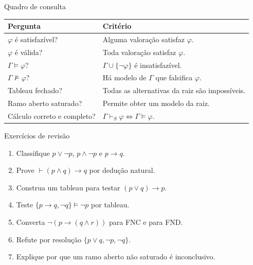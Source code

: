 \documentclass[10pt,aspectratio=169]{beamer}
\begin{document}
\begin{frame}{Quadro de consulta}

\small
\renewcommand{\arraystretch}{1.6}
\begin{tabular}{p{3.9cm}p{6.8cm}}
\toprule
Pergunta & Critério\\\midrule
$\varphi$ é satisfazível? & Alguma valoração satisfaz $\varphi$.\\
$\varphi$ é válida? & Toda valoração satisfaz $\varphi$.\\
$\Gamma\models\varphi$? & $\Gamma\cup\{\neg\varphi\}$ é insatisfazível.\\
$\Gamma\not\models\varphi$? & Há modelo de $\Gamma$ que falsifica $\varphi$.\\
Tableau fechado? & Todas as alternativas da raiz são impossíveis.\\
Ramo aberto saturado? & Permite obter um modelo da raiz.\\
Cálculo correto e completo? & $\Gamma\vdash_S\varphi\iff\Gamma\models\varphi$.\\\bottomrule
\end{tabular}\par
\end{frame}

\begin{frame}{Exercícios de revisão}

\begin{enumerate}
\item Classifique $p\lor\neg p$, $p\land\neg p$ e $p\to q$.
\item Prove $\vdash(p\land q)\to q$ por dedução natural.
\item Construa um tableau para testar $(p\lor q)\to p$.
\item Teste $\{p\to q,\neg q\}\models\neg p$ por tableau.
\item Converta $\neg(p\to(q\land r))$ para FNC e para FND.
\item Refute por resolução $\{p\lor q,\neg p,\neg q\}$.
\item Explique por que um ramo aberto não saturado é inconclusivo.
\end{enumerate}
\end{frame}
\end{document}
